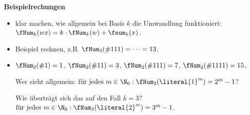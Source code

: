 \begin{tutorium}
  \noindent\textbf{Beispielrechungen}
  \begin{itemize}
  \item klar machen, wie allgemein bei Basis $k$ die Umwandlung
    funktioniert: $\fNum_k(wx) = k\cdot \fNum_k(w) +\fnum_k(x)$.
  \item Beispiel rechnen, z.B. $\fNum_3(\#{111})= \dots = 13$.
  \item $\fNum_2(\#{1})=1$, $\fNum_2(\#{11})=3$, $\fNum_2(\#{111})=7$,
    $\fNum_2(\#{1111})=15$,

    Wer sieht allgemein: $\text{für jedes }  m\in \N_0: \fNum_2(\literal{1}^m) = 2^m-1$?

    Wie überträgt sich das auf den Fall $k=3$? $\text{für jedes }  m\in \N_0:
    \fNum_3(\literal{2}^m) = 3^m-1$.
      
  \end{itemize}
\end{tutorium}

